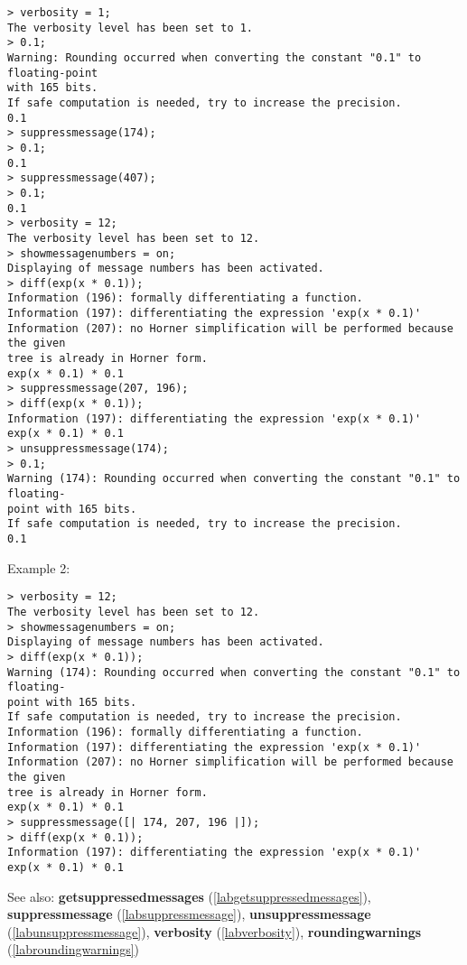 \begin{center}\begin{minipage}{15cm}\begin{Verbatim}[frame=single]
> verbosity = 1;
The verbosity level has been set to 1.
> 0.1;
Warning: Rounding occurred when converting the constant "0.1" to floating-point 
with 165 bits.
If safe computation is needed, try to increase the precision.
0.1
> suppressmessage(174);
> 0.1;
0.1
> suppressmessage(407);
> 0.1;
0.1
> verbosity = 12;
The verbosity level has been set to 12.
> showmessagenumbers = on;
Displaying of message numbers has been activated.
> diff(exp(x * 0.1));
Information (196): formally differentiating a function.
Information (197): differentiating the expression 'exp(x * 0.1)'
Information (207): no Horner simplification will be performed because the given 
tree is already in Horner form.
exp(x * 0.1) * 0.1
> suppressmessage(207, 196);
> diff(exp(x * 0.1));
Information (197): differentiating the expression 'exp(x * 0.1)'
exp(x * 0.1) * 0.1
> unsuppressmessage(174);
> 0.1;
Warning (174): Rounding occurred when converting the constant "0.1" to floating-
point with 165 bits.
If safe computation is needed, try to increase the precision.
0.1
\end{Verbatim}
\end{minipage}\end{center}
\noindent Example 2: 
\begin{center}\begin{minipage}{15cm}\begin{Verbatim}[frame=single]
> verbosity = 12;
The verbosity level has been set to 12.
> showmessagenumbers = on; 
Displaying of message numbers has been activated.
> diff(exp(x * 0.1));
Warning (174): Rounding occurred when converting the constant "0.1" to floating-
point with 165 bits.
If safe computation is needed, try to increase the precision.
Information (196): formally differentiating a function.
Information (197): differentiating the expression 'exp(x * 0.1)'
Information (207): no Horner simplification will be performed because the given 
tree is already in Horner form.
exp(x * 0.1) * 0.1
> suppressmessage([| 174, 207, 196 |]);
> diff(exp(x * 0.1));
Information (197): differentiating the expression 'exp(x * 0.1)'
exp(x * 0.1) * 0.1
\end{Verbatim}
\end{minipage}\end{center}
See also: \textbf{getsuppressedmessages} (\ref{labgetsuppressedmessages}), \textbf{suppressmessage} (\ref{labsuppressmessage}), \textbf{unsuppressmessage} (\ref{labunsuppressmessage}), \textbf{verbosity} (\ref{labverbosity}), \textbf{roundingwarnings} (\ref{labroundingwarnings})
